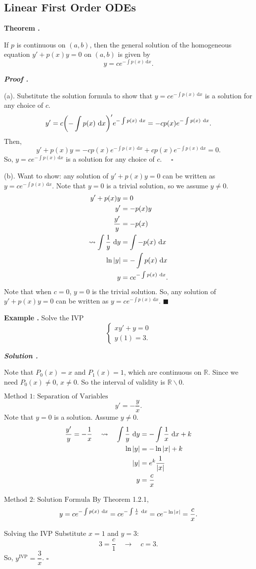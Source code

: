 \documentclass[12pt, a4paper]{article}
\newcounter{index}[subsection]
\newenvironment*{eg}{\begin{framed}\par\noindent\textbf{Example \thesubsection.\stepcounter{index}\theindex}}{\par\end{framed}}
\newenvironment*{thm}[1]{\begin{tcolorbox}\par\noindent\textbf{Theorem \thesubsection.\stepcounter{index}\theindex\ #1} \par}{\par\end{tcolorbox}}
\newcounter{nprf}[subsection]
\newenvironment*{prf}{\par\indent\textbf{\textit{Proof \stepcounter{nprf}\thenprf.}}}{\hfill$\blacksquare$\par}
\newenvironment*{sol}{\par\indent\textbf{\textit{Solution \stepcounter{nprf}\thenprf.}}\par}{\hfill{$\square$}\par}
\def\R{{\mathbb{R}}}
\def\d{{\mathrm{d}}}
\def\pqde{\quad\square}
\begin{document}
\subsection{Linear First Order ODEs}
\begin{thm}{}
	If $p$ is continuous on $(a,b)$, then the general solution of the homogeneous equation $y'+p(x)y=0$ on $(a,b)$ is given by \[y=ce^{-\int p(x)\ \d x}.\]
\end{thm}
\begin{prf}\par 
	(a). Substitute the solution formula to show that $y=ce^{-\int p(x)\ \d x}$ is a solution for any choice of $c$. \[y'=c\qty(-\int p(x)\ \d x)'e^{-\int p(x)\ \d x}=-cp(x)e^{-\int p(x)\ \d x}.\] Then, \[y'+p(x)y=-cp(x)e^{-\int p(x)\ \d x}+cp(x)e^{-\int p(x)\ \d x}=0.\] So, $y=ce^{-\int p(x)\ \d x}$ is a solution for any choice of $c$. $\pqde$\par
	(b). Want to show: any solution of $y'+p(x)y=0$ can be written as $y=ce^{-\int p(x)\ \d x}$. Note that $y=0$ is a trivial solution, so we assume $y\neq0$. \[\begin{aligned}y'+p(x)y&=0\\y'&=-p(x)y\\\dfrac{y'}{y}&=-p(x)\\\leadsto\int\dfrac{1}{y}\ \d y&=\int-p(x)\ \d x\\\ln\qty|y|&=-\int p(x)\ \d x\\y&=ce^{-\int p(x)\ \d x}.\end{aligned}\] Note that when $c=0$, $y=0$ is the trivial solution. So, any solution of $y'+p(x)y=0$ can be written as $y=ce^{-\int p(x)\ \d x}$.
\end{prf}
\begin{eg}
	Solve the IVP \[\begin{cases}xy'+y=0\\y(1)=3.\end{cases}\]
	\begin{sol}
		Note that $P_0(x)=x$ and $P_1(x)=1$, which are continuous on $\R$. Since we need $P_0(x)\neq0$, $x\neq0$. So the interval of validity is $\R\backslash\qty{0}$.\par 
		$\boxed{\text{Method 1: Separation of Variables}}$ \[y'=-\dfrac{y}{x}.\] Note that $y=0$ is a solution. Assume $y\neq0$. \[\begin{aligned}\dfrac{y'}{y}=-\dfrac{1}{x}\quad\leadsto\quad\int\dfrac{1}{y}\ \d y&=-\int\dfrac{1}{x}\ \d x+k\\\ln\qty|y|&=-\ln\qty|x|+k\\\qty|y|&=e^{k}\dfrac{1}{\qty|x|}\\y&=\dfrac{c}{x}\end{aligned}\]\par 
		$\boxed{\text{Method 2: Solution Formula}}$ By Theorem 1.2.1, \[y=ce^{-\int p(x)\ \d x}=ce^{-\int\frac{1}{x}\ \d x}=ce^{-\ln\qty|x|}=\dfrac{c}{x}.\]\par 
		$\boxed{\text{Solving the IVP}}$ Substitute $x=1$ and $y=3$: \[3=\dfrac{c}{1}\quad\longrightarrow\quad c=3.\] So, $y^\text{IVP}=\dfrac{3}{x}$.
	\end{sol}
\end{eg}
\end{document}
